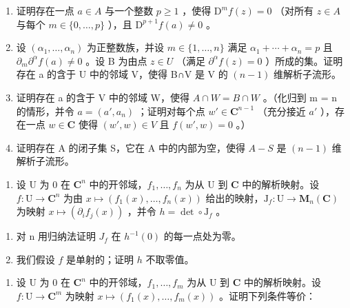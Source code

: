 \begin{enumerate}
\def\labelenumi{\alph{enumi})}
\item
  证明存在一点 \(a \in A\) 与一个整数 \(p \geqslant 1\) ，使得 \(\mathrm{D}^{m}f(z) = 0\) （对所有 \(z \in A\) 与每个 \(m \in \{0, \ldots, p\}\) ），且 \(\mathrm{D}^{p+1}f(a) \neq 0\) 。
\item
  设 \((\alpha_{1},\ldots,\alpha_{n})\) 为正整数族，并设 \(m\in\{1,\ldots,n\}\) 满足 \(\alpha_{1}+\cdots+\alpha_{n}=p\) 且 \(\partial_{m}\partial^{\alpha}f(a)\neq0\) 。设 B 为由点 \(z\in U\) （满足 \(\partial^{\alpha}f(z)=0\) ）所成的集。证明存在 a 的含于 U 中的邻域 V，使得 B∩V 是 V 的 \((n-1)\) 维解析子流形。
\item
  证明存在 a 的含于 V 中的邻域 W，使得 \(A \cap W = B \cap W\) 。（化归到 m = n 的情形，并令 \(a = (a', a_n)\) ；证明对每个点 \(w' \in \mathbf{C}^{n-1}\) （充分接近 \(a'\) ），存在一点 \(w \in \mathbf{C}\) 使得 \((w', w) \in V\) 且 \(f(w', w) = 0\) 。）
\item
  证明存在 A 的闭子集 S，它在 A 中的内部为空，使得 \(A - S\) 是 \((n - 1)\) 维解析子流形。
\end{enumerate}

\begin{enumerate}
\def\labelenumi{\arabic{enumi})}
\setcounter{enumi}{4}
\tightlist
\item
  设 U 为 0 在 \(\mathbf{C}^n\) 中的开邻域，\(f_1, \ldots, f_n\) 为从 U 到 \(\mathbf{C}\) 中的解析映射。设 \(f\colon \mathrm{U} \to \mathbf{C}^n\) 为由 \(x \mapsto (f_1(x), \ldots, f_n(x))\) 给出的映射，\(\mathrm{J}_f\colon \mathrm{U} \to \mathbf{M}_n(\mathbf{C})\) 为映射 \(x \mapsto (\partial_i f_j(x))\) ，并令 \(h = \det \circ \mathrm{J}_f\) 。
\end{enumerate}

\begin{enumerate}
\def\labelenumi{\alph{enumi})}
\item
  对 n 用归纳法证明 \(J_{f}\) 在 \(h^{-1}(0)\) 的每一点处为零。
\item
  我们假设 \(f\) 是单射的；证明 \(h\) 不取零值。
\end{enumerate}

\begin{enumerate}
\def\labelenumi{\arabic{enumi})}
\setcounter{enumi}{5}
\tightlist
\item
  设 U 为 0 在 \(\mathbf{C}^{n}\) 中的开邻域，\(f_{1},\ldots ,f_{m}\) 为从 U 到 \(\mathbf{C}\) 中的解析映射。设 \(f\colon \mathrm{U}\to \mathbf{C}^m\) 为映射 \(x\mapsto (f_1(x),\dots ,f_m(x))\) 。证明下列条件等价：
\end{enumerate}


